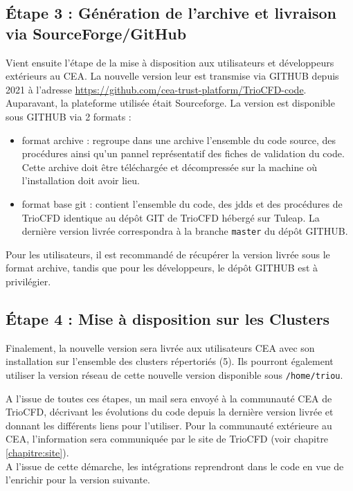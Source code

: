 \subsection{Étape 3 : G\'en\'eration de l'archive et livraison via SourceForge/GitHub}
Vient ensuite l'étape de la mise à disposition aux utilisateurs et développeurs extérieurs au CEA. La nouvelle version leur est transmise via GITHUB depuis 2021 à l'adresse \url{https://github.com/cea-trust-platform/TrioCFD-code}. Auparavant, la plateforme utilisée était Sourceforge. La version est disponible sous GITHUB via 2 formats :
\begin{itemize}
   \item format archive : regroupe dans une archive l'ensemble du code source, des procédures ainsi qu'un pannel représentatif des fiches de validation du code. Cette archive doit être téléchargée et décompressée sur la machine où l'installation doit avoir lieu.
   \item format base git : contient l'ensemble du code, des jdds et des procédures de TrioCFD identique au dépôt GIT de TrioCFD hébergé sur Tuleap. La dernière version livrée correspondra à la branche \texttt{master} du dépôt GITHUB.
\end{itemize}
Pour les utilisateurs, il est recommandé de récupérer la version livrée sous le format archive, tandis que pour les développeurs, le dépôt GITHUB est à privilégier.
\subsection{Étape 4 : Mise \`a disposition sur les Clusters}
Finalement, la nouvelle version sera livrée aux utilisateurs CEA avec son installation sur l'ensemble des clusters répertoriés (5). Ils pourront également utiliser la version réseau de cette nouvelle version disponible sous \texttt{/home/triou}.\vspace{1cm}

A l'issue de toutes ces étapes, un mail sera envoyé à la communauté CEA de TrioCFD, décrivant les évolutions du code depuis la dernière version livrée et donnant les différents liens pour l'utiliser. Pour la communauté extérieure au CEA, l'information sera communiquée par le site de TrioCFD (voir chapitre \ref{chapitre:site}).\\
A l'issue de cette démarche, les intégrations reprendront dans le code en vue de l'enrichir pour la version suivante.

